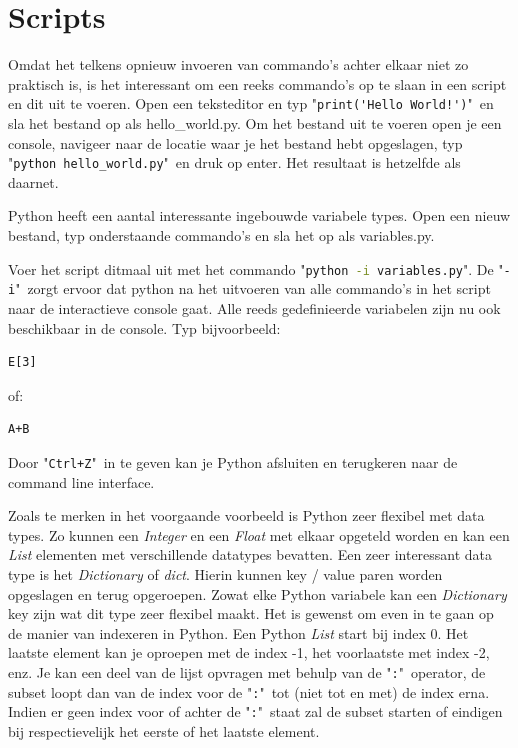 \documentclass[11pt,twoside]{article}
\begin{document}
 	\section{Scripts}
Omdat het telkens opnieuw invoeren van commando's achter elkaar niet zo praktisch is, is het interessant om een reeks commando's op te slaan in een script en dit uit te voeren. Open een teksteditor en typ "\lstinline{print('Hello World!')}"\ en sla het bestand op als \textsf{hello\_world.py}. Om het bestand uit te voeren open je een console, navigeer naar de locatie waar je het bestand hebt opgeslagen, typ "\lstinline[language=bash]{python hello_world.py}"\ en druk op enter. Het resultaat is hetzelfde als daarnet.

Python heeft een aantal interessante ingebouwde variabele types. Open een nieuw bestand, typ onderstaande commando's en sla het op als \textsf{variables.py}.


Voer het script ditmaal uit met het commando "\lstinline[language=bash]{python -i variables.py}". De "\lstinline[language=bash]{-i}"\ zorgt ervoor dat python na het uitvoeren van alle commando's in het script naar de interactieve console gaat. Alle reeds gedefinieerde variabelen zijn nu ook beschikbaar in de console. Typ bijvoorbeeld:
\begin{lstlisting}
E[3]
\end{lstlisting}
of:
\begin{lstlisting}
A+B
\end{lstlisting}
Door "\lstinline{Ctrl+Z}"\ in te geven kan je Python afsluiten en terugkeren naar de command line interface.

Zoals te merken in het voorgaande voorbeeld is Python zeer flexibel met data types. Zo kunnen een \emph{Integer} en een \emph{Float} met elkaar opgeteld worden en kan een \emph{List} elementen met verschillende datatypes bevatten. Een zeer interessant data type is het \emph{Dictionary} of \emph{dict}. Hierin kunnen key / value paren worden opgeslagen en terug opgeroepen. Zowat elke Python variabele kan een \emph{Dictionary} key zijn wat dit type zeer flexibel maakt. Het is gewenst om even in te gaan op de manier van indexeren in Python. Een Python \emph{List} start bij index 0. Het laatste element kan je oproepen met de index -1, het voorlaatste met index -2, enz. Je kan een deel van de lijst opvragen met behulp van de "\lstinline{:}"\ operator, de subset loopt dan van de index voor de "\lstinline{:}"\ tot (niet tot en met) de index erna. Indien er geen index voor of achter de "\lstinline{:}"\ staat zal de subset starten of eindigen bij respectievelijk het eerste of het laatste element.
\end{document}
